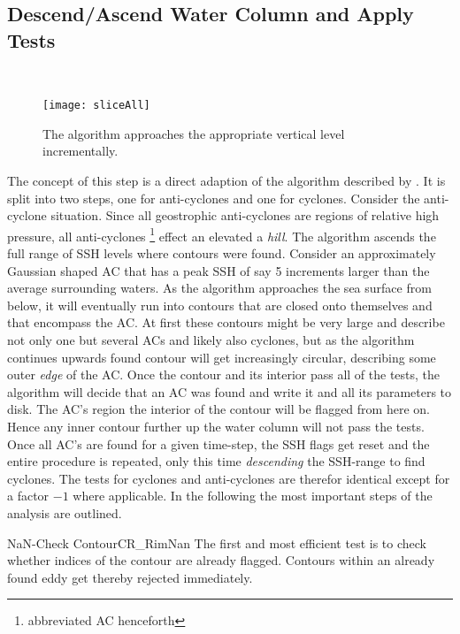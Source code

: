 \subsection{Descend/Ascend Water Column and Apply Tests}
 \\
\begin{figure}
	\texttt{[image: sliceAll]}
	\caption{The algorithm approaches the appropriate vertical level incrementally.}
	\label{fig:sliceAll}
\end{figure}
The concept of this step is a direct adaption of the algorithm described
by \citet{Chelton2011}. It is split into two steps, one for anti-cyclones and one
for cyclones. Consider \eg the anti-cyclone situation. Since all
geostrophic anti-cyclones are regions of relative high pressure, all
anti-cyclones \footnote{abbreviated AC henceforth} effect an elevated \SSH \ie
a \textit{hill}. The algorithm ascends the full range of SSH levels where
contours were found. Consider an approximately Gaussian shaped AC that has a
peak SSH of say 5 increments larger than the average surrounding waters.
As the algorithm approaches the sea surface from below, it will eventually run
into contours that are closed onto themselves and that encompass the AC. At
first these contours might be very large and describe not only one but several
ACs and likely also cyclones, but as the algorithm continues upwards found
contour will get increasingly circular, describing some outer \textit{edge} of
the AC. Once the contour and its interior pass all of the tests, the algorithm
will decide that an AC was found and write it and all its parameters to disk.
The AC's region \ie the interior of the contour will be flagged from here on.
Hence any inner contour further up the water column will not pass the tests.
Once all AC's are found for a given time-step, the SSH flags get reset and the
entire procedure is repeated, only this time \textit{descending} the SSH-range to
find cyclones. The tests for cyclones and anti-cyclones are therefor identical except for
a factor $-1$ where applicable. In the following the most important steps of the
analysis are
outlined.
\begin{filter}{NaN-Check Contour}{CR_RimNan}
The first and most efficient test is to check whether indices of the
contour are already flagged. Contours within an already found eddy get thereby
rejected immediately.
\end{filter}\newline
